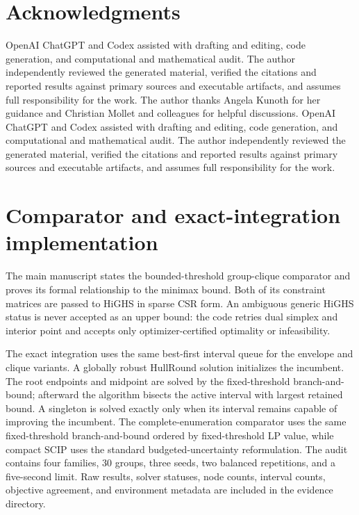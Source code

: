 \documentclass[11pt]{article}
\theoremstyle{plain}
\theoremstyle{definition}
\theoremstyle{remark}
\begin{document}
\section*{Acknowledgments}
\ifblind
OpenAI ChatGPT and Codex assisted with drafting and editing, code generation, and computational and mathematical audit.  The author independently reviewed the generated material, verified the citations and reported results against primary sources and executable artifacts, and assumes full responsibility for the work.
\else
The author thanks Angela Kunoth for her guidance and Christian Mollet and colleagues for helpful discussions.
OpenAI ChatGPT and Codex assisted with drafting and editing, code generation, and computational and mathematical audit.  The author independently reviewed the generated material, verified the citations and reported results against primary sources and executable artifacts, and assumes full responsibility for the work.
\fi

\fi

\ifincludeappendix
\FloatBarrier
\appendix
{}

\section{Comparator and exact-integration implementation}\label{app:implementation}

The main manuscript states the bounded-threshold group-clique comparator and proves its formal relationship to the minimax bound.  Both of its constraint matrices are passed to HiGHS in sparse CSR form.  An ambiguous generic HiGHS status is never accepted as an upper bound: the code retries dual simplex and interior point and accepts only optimizer-certified optimality or infeasibility.

The exact integration uses the same best-first interval queue for the envelope and clique variants.  A globally robust HullRound solution initializes the incumbent.  The root endpoints and midpoint are solved by the fixed-threshold branch-and-bound; afterward the algorithm bisects the active interval with largest retained bound.  A singleton is solved exactly only when its interval remains capable of improving the incumbent.  The complete-enumeration comparator uses the same fixed-threshold branch-and-bound ordered by fixed-threshold LP value, while compact SCIP uses the standard budgeted-uncertainty reformulation.  The audit contains four families, 30 groups, three seeds, two balanced repetitions, and a five-second limit.  Raw results, solver statuses, node counts, interval counts, objective agreement, and environment metadata are included in the evidence directory.
\end{document}
